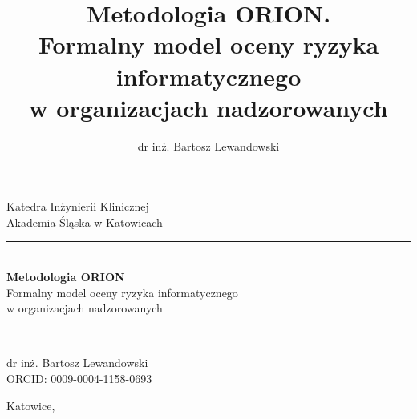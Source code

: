 \documentclass[12pt,a4paper,oneside]{book}
\title{Metodologia ORION.\\
Formalny model oceny ryzyka informatycznego\\
w organizacjach nadzorowanych}
\author[1]{dr inż. Bartosz Lewandowski}
\affil[1]{Katedra Inżynierii Klinicznej, Akademia Śląska}
\date{}
\begin{document}
\begin{titlepage}
\centering
\vspace*{3cm}

{\large Katedra Inżynierii Klinicznej}\\[0.2cm]
{\large Akademia Śląska w Katowicach}\\[3cm]

\rule{\textwidth}{1.5pt}\\[0.8cm]

{\Huge\bfseries Metodologia ORION}\\[0.7cm]

{\LARGE Formalny model oceny ryzyka informatycznego\\[0.3cm]
w organizacjach nadzorowanych}\\[0.8cm]

\rule{\textwidth}{1.5pt}\\[3cm]

{\large dr inż. Bartosz Lewandowski}\\[0.3cm]
{\small ORCID: 0009-0004-1158-0693}

\vfill

{\normalsize Katowice, \the\year}

\end{titlepage}

\tableofcontents





























\end{document}
